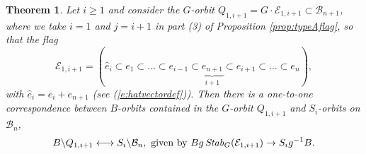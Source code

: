 \documentclass[12pt]{amsart}
\numberwithin{equation}{section}
\newtheorem{thm}{Theorem}[section]
\newcommand{\C}{\mbox{${\mathbb C}$}}
\newcommand{\B}{\mathcal{B}}
\newcommand{\F}{\mathcal{F}}
\begin{document}
\begin{thm}\label{thm:firstbig}
Let $i\geq 1$ and consider the $G$-orbit $Q_{1,i+1}=G\cdot \mathcal{E}_{1,i+1}\subset \B_{n+1}$, 
where we take $i=1$ and $j=i+1$ in part (3) of Proposition \ref{prop:typeAflag}, so that the flag
\begin{equation}\label{eq:Fioneflag}
\mathcal{E}_{1,i+1}=(\hat{e}_{i}\subset e_{1}\subset\dots\subset e_{i-1}\subset\underbrace{e_{n+1}}_{i+1}\subset e_{i+1}\subset \dots \subset e_{n}), 
\end{equation}
with $\hat{e}_{i}=e_{i}+e_{n+1}$ (see (\ref{e:hatvectordef})).  Then there is a one-to-one correspondence between $B$-orbits contained in the $G$-orbit $Q_{1,i+1}$ and $S_{i}$-orbits on $\B_{n}$, 
\begin{equation}\label{eq:firstcorresp}
B\backslash Q_{1,i+1}\longleftrightarrow S_{i}\backslash\B_{n}, \text{ given by }
Bg\, \mbox{\emph{Stab}}_{G}(\mathcal{E}_{1,i+1}) \to S_ig^{-1}B.
\end{equation}
\end{thm}
\end{document}
